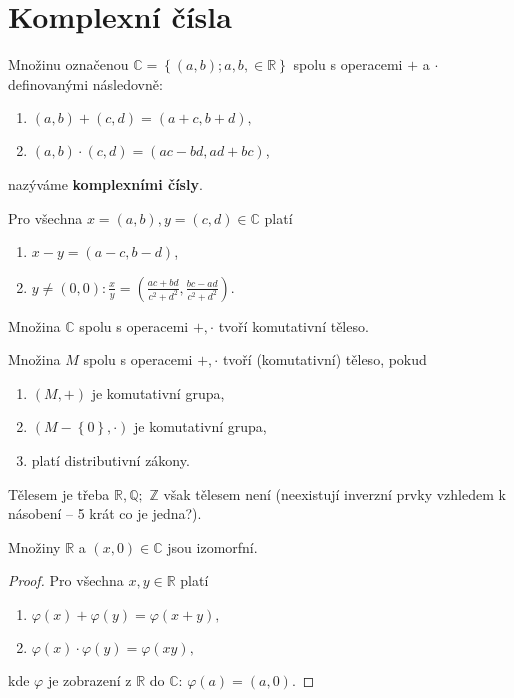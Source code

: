 \section{Komplexní čísla}
\begin{definition}\label{kompl_c_def}
Množinu označenou $\mathbb C = \left \{ (a,b);  a,b, \in \mathbb R \right \} $
spolu s operacemi $+$ a $\cdot$ definovanými následovně:
\begin{enumerate}[$i.$]
\item $(a,b) + (c,d) = (a+c, b+d),$
\item $(a,b) \cdot (c,d) = (ac-bd, ad+bc)$,
\end{enumerate}
nazýváme \textbf{komplexními čísly}.
\end{definition}

\begin{veta}
    Pro všechna $x=(a,b),y=(c,d) \in \mathbb C$ platí
    \begin{enumerate}[$i.$]
    \item $x-y=(a-c, b-d)$,
   	\item $y\ne (0,0): \frac{x}{y}=\left ( \frac{ac+bd}{c^2+d^2}, \frac{bc-ad}{c^2+d^2} \right ) .$
    \end{enumerate}
\end{veta}

\begin{veta}
    Množina $\mathbb C$ spolu s operacemi $+,\cdot$ tvoří komutativní těleso.
\end{veta}

\begin{pozn}\label{teleso}
    Množina $M$ spolu s operacemi $+,\cdot$ tvoří (komutativní) těleso, pokud
    \begin{enumerate}[$i.$]
    \item $(M,+)$ je komutativní grupa,
   	\item $(M-\left \{ 0 \right \} ,\cdot)$ je komutativní grupa,
   	\item platí distributivní zákony.
    \end{enumerate}
    Tělesem je třeba $\mathbb R, \mathbb Q;$ $\mathbb Z$ však tělesem není (neexistují
    inverzní prvky vzhledem k násobení -- 5 krát co je jedna?).
\end{pozn}

\begin{veta}
    Množiny $\mathbb R$ a $(x,0)\in \mathbb C$ jsou izomorfní.
\end{veta}

\begin{proof}
    Pro všechna $x,y \in \mathbb R$ platí
    \begin{enumerate}[$i.$]
    \item $\varphi(x)+\varphi(y) = \varphi(x+y),$
   	\item $\varphi(x)\cdot\varphi(y) = \varphi(xy),$
    \end{enumerate}
    kde $\varphi$ je zobrazení z $\mathbb R$ do $\mathbb C$: $\varphi(a)=(a,0).$
\end{proof}

